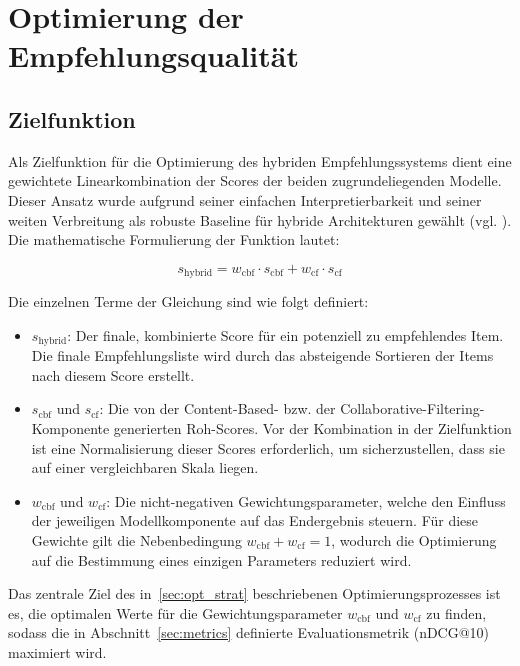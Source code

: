 \section{Optimierung der Empfehlungsqualität}
\subsection{Zielfunktion}
\label{sec:target_function}
Als Zielfunktion für die Optimierung des hybriden Empfehlungssystems dient eine gewichtete 
Linearkombination der Scores der beiden zugrundeliegenden Modelle. Dieser Ansatz wurde 
aufgrund seiner einfachen Interpretierbarkeit und seiner weiten Verbreitung als robuste 
Baseline für hybride Architekturen gewählt (vgl. \cite{burke_hybrid_2002}). 
Die mathematische Formulierung der Funktion lautet:

\begin{equation}
\label{eq:target}
s_\mathrm{hybrid} = w_\mathrm{cbf} \cdot s_\mathrm{cbf} + w_\mathrm{cf} \cdot s_\mathrm{cf}
\end{equation}

Die einzelnen Terme der Gleichung sind wie folgt definiert:
\begin{itemize}
    \item $s_\mathrm{hybrid}$: Der finale, kombinierte Score für ein potenziell zu empfehlendes Item. 
    Die finale Empfehlungsliste wird durch das absteigende Sortieren der Items nach diesem Score erstellt.
    
    \item $s_\mathrm{cbf}$ und $s_\mathrm{cf}$: Die von der Content-Based- bzw. der Collaborative-Filtering-Komponente 
    generierten Roh-Scores. Vor der Kombination in der Zielfunktion ist eine Normalisierung dieser 
    Scores erforderlich, um sicherzustellen, dass sie auf einer vergleichbaren Skala liegen.
    
    \item $w_\mathrm{cbf}$ und $w_\mathrm{cf}$: Die nicht-negativen Gewichtungsparameter, welche den Einfluss 
    der jeweiligen Modellkomponente auf das Endergebnis steuern. Für diese Gewichte gilt die Nebenbedingung 
    $w_\mathrm{cbf} + w_\mathrm{cf} = 1$, wodurch die Optimierung auf die Bestimmung eines einzigen 
    Parameters reduziert wird.
\end{itemize}

Das zentrale Ziel des in~\ref{sec:opt_strat} beschriebenen Optimierungsprozesses 
ist es, die optimalen Werte für die Gewichtungsparameter $w_\mathrm{cbf}$ und $w_\mathrm{cf}$ zu finden, 
sodass die in Abschnitt~\ref{sec:metrics} definierte Evaluationsmetrik (nDCG@10) maximiert wird.

